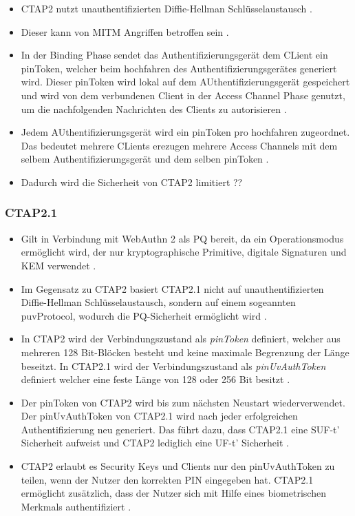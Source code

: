 \begin{itemize}
    \item \ac{CTAP2} nutzt unauthentifizierten Diffie-Hellman Schlüsselaustausch \cite{barbosa2021provable}.
    \item Dieser kann von \ac{MITM} Angriffen betroffen sein \cite{barbosa2021provable}.
    \item In der Binding Phase sendet das Authentifizierungsgerät dem CLient ein pinToken, welcher beim hochfahren des Authentifizierungsgerätes generiert wird. Dieser pinToken wird lokal auf dem AUthentifizierungsgerät gespeichert und wird von dem verbundenen Client in der Access Channel Phase genutzt, um die nachfolgenden Nachrichten des Clients zu autorisieren \cite{barbosa2021provable}.
    \item Jedem AUthentifizierungsgerät wird ein pinToken pro hochfahren zugeordnet. Das bedeutet mehrere CLients erezugen mehrere Access Channels mit dem selbem Authentifizierungsgerät und dem selben pinToken \cite{barbosa2021provable}.
    \item Dadurch wird die Sicherheit von \ac{CTAP2} limitiert ??
\end{itemize}

\subsubsection{CTAP2.1}
\begin{itemize}
    \item Gilt in Verbindung mit WebAuthn 2 als \ac{PQ} bereit, da ein Operationsmodus ermöglicht wird, der nur kryptographische Primitive, digitale Signaturen und \ac{KEM} verwendet \cite{bindel2022fido2}.
    \item Im Gegensatz zu \ac{CTAP2} basiert CTAP2.1 nicht auf unauthentifizierten Diffie-Hellman Schlüsselaustausch, sondern auf einem sogeannten \ac{puvProtocol}, wodurch die \ac{PQ}-Sicherheit ermöglicht wird \cite{bindel2022fido2}.
    \item In \ac{CTAP2} wird der Verbindungszustand als \textit{pinToken} definiert, welcher aus mehreren 128 Bit-Blöcken besteht und keine maximale Begrenzung der Länge beseitzt. In CTAP2.1 wird der Verbindungszustand als \textit{pinUvAuthToken} definiert welcher eine feste Länge von 128 oder 256 Bit besitzt \cite{bindel2022fido2}.
    \item Der pinToken von \ac{CTAP2} wird bis zum nächsten Neustart wiederverwendet. Der pinUvAuthToken von CTAP2.1 wird nach jeder erfolgreichen Authentifizierung neu generiert. Das führt dazu, dass CTAP2.1 eine \ac{SUF}-t' Sicherheit aufweist und \ac{CTAP2} lediglich eine \ac{UF}-t' Sicherheit \cite{bindel2022fido2}.
    \item \ac{CTAP2} erlaubt es Security Keys und Clients nur den pinUvAuthToken zu teilen, wenn der Nutzer den korrekten PIN eingegeben hat. CTAP2.1 ermöglicht zusätzlich, dass der Nutzer sich mit Hilfe eines biometrischen Merkmals authentifiziert \cite{bindel2022fido2}.
\end{itemize}

